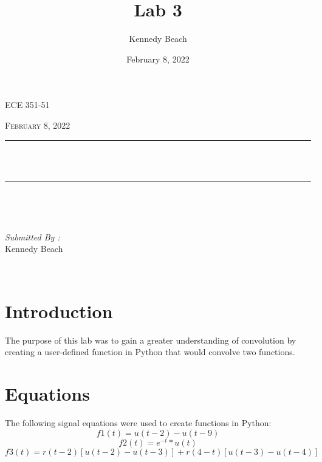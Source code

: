 \documentclass[12pt]{report}
\title{Lab 3}
\author{Kennedy Beach}
\date{February 8, 2022}
\makeatletter
\let\thetitle\@title
\makeatother
\begin{document}
\begin{titlepage}
\centering
\vspace*{0.5 cm}
\begin{center}    \textsc{\Large   ECE 351-51 }\\[2.0 cm]
\end{center}%
\textsc{\Large February 8, 2022}\\[0.5 cm] %
\rule{\linewidth}{0.2 mm} \\[0.4 cm]
{ \huge \bfseries \thetitle}\\
\rule{\linewidth}{0.2 mm} \\[1.5 cm]
\begin{minipage}{0.4\textwidth}
\begin{flushleft} \large
\end{flushleft}
\end{minipage}~
\begin{minipage}{0.4\textwidth}
\begin{flushright} \large
\emph{Submitted By :} \\
Kennedy Beach
\end{flushright}
\end{minipage}\\[2 cm]
\end{titlepage}
\tableofcontents
\pagebreak
\renewcommand{\thesection}{\arabic{section}}
\section{Introduction}
The purpose of this lab was to gain a greater understanding of convolution by creating a user-defined function in Python that would convolve two functions. 

\section{Equations}
The following signal equations were used to create functions in Python:
\begin{equation*}
f1(t) = u(t-2) - u(t-9)
\end{equation*}
\begin{equation*}
f2(t) = e^{-t} * u(t)
\end{equation*}
\begin{equation*}
f3(t) = r(t-2)[u(t-2) - u(t-3)] + r(4-t)[u(t-3) - u(t-4)]
\end{equation*}
\end{document}
